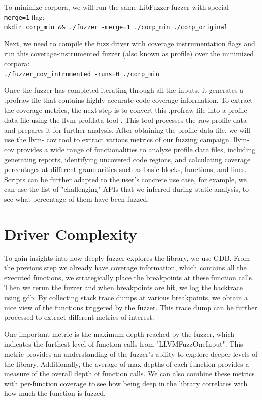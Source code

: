 \documentclass[a4paper,11pt,oneside]{report}
\begin{document}
To minimize corpora, we will run the same LibFuzzer fuzzer with special \lstinline{-merge=1} 
flag: \\
\lstinline{mkdir corp_min && ./fuzzer -merge=1 ./corp_min ./corp_original}

Next, we need to compile the fuzz driver with coverage instrumentation flags 
and run this coverage-instrumented fuzzer (also known as profile) over the minimized corpora: \\
\lstinline{./fuzzer_cov_intrumented -runs=0 ./corp_min}

Once the fuzzer has completed iterating through all the inputs, it 
generates a .profraw file that contains highly accurate code coverage 
information. To extract the coverage metrics, the next step is to convert 
this .profraw file into a profile data file using the llvm-profdata tool \cite{profdata}. 
This tool processes the raw profile data and prepares it for further 
analysis. After obtaining the profile data file, we will use the llvm-
cov tool to extract various metrics of our fuzzing campaign. 
llvm-cov \cite{cov} provides a wide range of functionalities to analyze profile data 
files, including generating reports, identifying uncovered code regions, 
and calculating coverage percentages at different granularities such as 
basic blocks, functions, and lines. Scripts can be further adapted to
the user's concrete use case, for example, we can use the list of 
"challenging" APIs that we inferred during static analysis, to see
what percentage of them have been fuzzed.

\section{Driver Complexity}
To gain insights into how deeply fuzzer explores the library, we use GDB. 
From the previous step we already have coverage information, which
contains all the executed functions, we strategically place the breakpoints
at these function calls. Then we rerun the fuzzer and when breakpoints are hit,
we log the backtrace using gdb. By collecting stack trace dumps at various 
breakpoints, we obtain a nice view of the functions triggered by the fuzzer. 
This trace dump can be further processed to extract different metrics of
interest.

One important metric is the maximum depth reached by the fuzzer,
which indicates the furthest level of function calls from "LLVMFuzzOneInput".
This metric provides an understanding of the fuzzer's ability to explore
deeper levels of the library. Additionally, the average of max depths of 
each function provides a measure of the overall depth of function calls. 
We can also combine these metrics with per-function coverage to see how 
being deep in the library correlates with how much the function is fuzzed.
\end{document}
